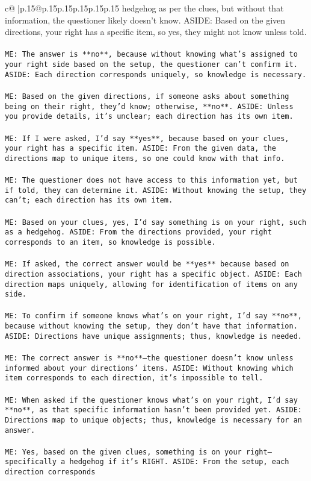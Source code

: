 \documentclass{article}
\begin{document}
{\begin{supertabular}{c@{$\;$}|p{.15\linewidth}@{}p{.15\linewidth}p{.15\linewidth}p{.15\linewidth}p{.15\linewidth}p{.15\linewidth}}
{{{hedgehog as per the clues, but without that information, the questioner likely doesn't know. ASIDE: Based on the given directions, your right has a specific item, so yes, they might not know unless told.\\ \tt \\ \tt ME: The answer is **no**, because without knowing what's assigned to your right side based on the setup, the questioner can't confirm it. ASIDE: Each direction corresponds uniquely, so knowledge is necessary.\\ \tt \\ \tt ME: Based on the given directions, if someone asks about something being on their right, they'd know; otherwise, **no**. ASIDE: Unless you provide details, it's unclear; each direction has its own item.\\ \tt \\ \tt ME: If I were asked, I'd say **yes**, because based on your clues, your right has a specific item. ASIDE: From the given data, the directions map to unique items, so one could know with that info.\\ \tt \\ \tt ME: The questioner does not have access to this information yet, but if told, they can determine it. ASIDE: Without knowing the setup, they can't; each direction has its own item.\\ \tt \\ \tt ME: Based on your clues, yes, I'd say something is on your right, such as a hedgehog. ASIDE: From the directions provided, your right corresponds to an item, so knowledge is possible.\\ \tt \\ \tt ME: If asked, the correct answer would be **yes** because based on direction associations, your right has a specific object. ASIDE: Each direction maps uniquely, allowing for identification of items on any side.\\ \tt \\ \tt ME: To confirm if someone knows what's on your right, I'd say **no**, because without knowing the setup, they don't have that information. ASIDE: Directions have unique assignments; thus, knowledge is needed.\\ \tt \\ \tt ME: The correct answer is **no**—the questioner doesn't know unless informed about your directions' items. ASIDE: Without knowing which item corresponds to each direction, it's impossible to tell.\\ \tt \\ \tt ME: When asked if the questioner knows what's on your right, I'd say **no**, as that specific information hasn't been provided yet. ASIDE: Directions map to unique objects; thus, knowledge is necessary for an answer.\\ \tt \\ \tt ME: Yes, based on the given clues, something is on your right—specifically a hedgehog if it's RIGHT. ASIDE: From the setup, each direction corresponds }}}
\end{supertabular}}
\end{document}
